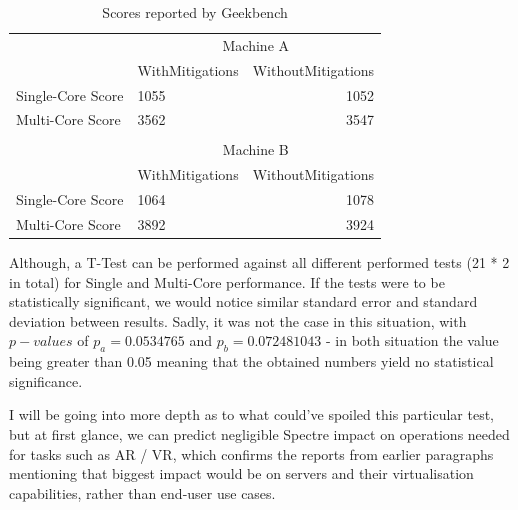 \documentclass{csfourzero}
\begin{document}
\begin{table}[h]
\centering
\begin{tabular}{llr}
\cline{2-3}
\multicolumn{1}{c|}{}                   & \multicolumn{2}{c|}{Machine A}                                                 \\ \cline{2-3} 
\multicolumn{1}{l|}{}                   & \multicolumn{1}{l|}{WithMitigations} & \multicolumn{1}{r|}{WithoutMitigations} \\ \hline
\multicolumn{1}{|l|}{Single-Core Score} & \multicolumn{1}{l|}{1055}            & \multicolumn{1}{r|}{1052}               \\ \hline
\multicolumn{1}{|l|}{Multi-Core Score}  & \multicolumn{1}{l|}{3562}            & \multicolumn{1}{r|}{3547}               \\ \hline
                                        &                                      & \multicolumn{1}{l}{}                    \\ \cline{2-3} 
\multicolumn{1}{l|}{}                   & \multicolumn{2}{c|}{Machine B}                                                 \\ \cline{2-3} 
\multicolumn{1}{l|}{}                   & \multicolumn{1}{l|}{WithMitigations} & \multicolumn{1}{r|}{WithoutMitigations} \\ \hline
\multicolumn{1}{|l|}{Single-Core Score} & \multicolumn{1}{l|}{1064}            & \multicolumn{1}{r|}{1078}               \\ \hline
\multicolumn{1}{|l|}{Multi-Core Score}  & \multicolumn{1}{l|}{3892}            & \multicolumn{1}{r|}{3924}               \\ \hline
\end{tabular}
\caption{Scores reported by Geekbench}
\label{tab:geekbench}
\end{table}

Although, a T-Test can be performed against all different performed tests (21 * 2 in total) for Single and Multi-Core performance. If the tests were to be statistically significant, we would notice similar standard error and standard deviation between results. Sadly, it was not the case in this situation, with $p-values$ of $p_{a} = 0.0534765$ and $p_{b} = 0.072481043$ - in both situation the value being greater than 0.05 meaning that the obtained numbers yield no statistical significance.

I will be going into more depth as to what could've spoiled this particular test, but at first glance, we can predict negligible Spectre impact on operations needed for tasks such as AR / VR, which confirms the reports from earlier paragraphs mentioning that biggest impact would be on servers and their virtualisation capabilities, rather than end-user use cases.
\end{document}
